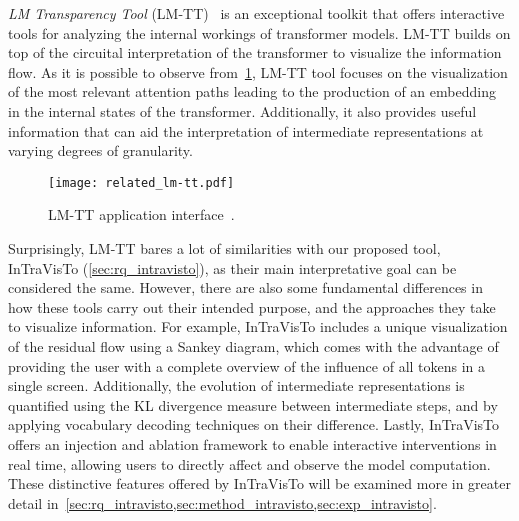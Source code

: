 \emph{LM Transparency Tool} (LM-TT)~\cite{tufanov2024} is an exceptional toolkit that offers interactive tools for analyzing the internal workings of transformer models.
LM-TT builds on top of the circuital interpretation of the transformer to visualize the information flow.
As it is possible to observe from~\cref{fig:related_lm-tt}, LM-TT tool focuses on the visualization of the most relevant attention paths leading to the production of an embedding in the internal states of the transformer.
Additionally, it also provides useful information that can aid the interpretation of intermediate representations at varying degrees of granularity.

\begin{figure}[t!]
    \centering
    \texttt{[image: related\_lm-tt.pdf]}
    \caption{LM-TT application interface~\cite{tufanov2024}.}
    \label{fig:related_lm-tt}
\end{figure}

Surprisingly, LM-TT bares a lot of similarities with our proposed tool, InTraVisTo (\cref{sec:rq_intravisto}), as their main interpretative goal can be considered the same.
However, there are also some fundamental differences in how these tools carry out their intended purpose, and the approaches they take to visualize information.
For example, InTraVisTo includes a unique visualization of the residual flow using a Sankey diagram, which comes with the advantage of providing the user with a complete overview of the influence of all tokens in a single screen.
Additionally, the evolution of intermediate representations is quantified using the KL divergence measure between intermediate steps, and by applying vocabulary decoding techniques on their difference.
Lastly, InTraVisTo offers an injection and ablation framework to enable interactive interventions in real time, allowing users to directly affect and observe the model computation.
These distinctive features offered by InTraVisTo will be examined more in greater detail in~\cref{sec:rq_intravisto,sec:method_intravisto,sec:exp_intravisto}.